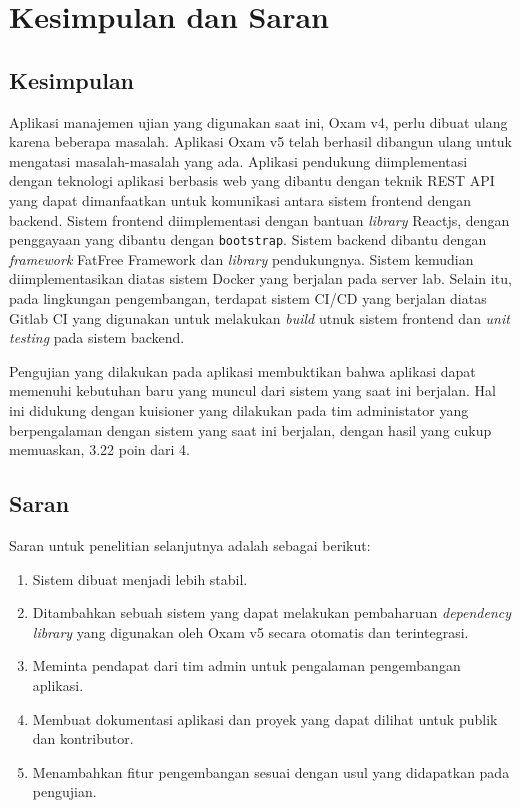 \chapter{Kesimpulan dan Saran}
\label{chap:kesimpulan-saran}

\section{Kesimpulan}
    Aplikasi manajemen ujian yang digunakan saat ini, Oxam v4, perlu dibuat ulang karena beberapa masalah. 
    Aplikasi Oxam v5 telah berhasil dibangun ulang untuk mengatasi masalah-masalah yang ada.
    Aplikasi pendukung diimplementasi dengan teknologi aplikasi berbasis web yang dibantu dengan teknik REST API
    yang dapat dimanfaatkan untuk komunikasi antara sistem frontend dengan backend. Sistem frontend diimplementasi
    dengan bantuan \textit{library} Reactjs, dengan penggayaan yang dibantu dengan \texttt{bootstrap}. Sistem
    backend dibantu dengan \textit{framework} FatFree Framework dan \textit{library} pendukungnya. Sistem
    kemudian diimplementasikan diatas sistem Docker yang berjalan pada server lab. Selain itu, pada lingkungan
    pengembangan, terdapat sistem CI/CD yang berjalan diatas Gitlab CI yang digunakan untuk melakukan
    \textit{build} utnuk sistem frontend dan \textit{unit testing} pada sistem backend.
    
    Pengujian yang dilakukan pada aplikasi membuktikan  bahwa aplikasi dapat memenuhi kebutuhan baru yang muncul
    dari sistem yang saat ini berjalan. Hal ini didukung dengan kuisioner yang dilakukan pada tim administator
    yang berpengalaman dengan sistem yang saat ini berjalan, dengan hasil yang cukup memuaskan, 3.22 poin dari 4.
    
\section{Saran}
    Saran untuk penelitian selanjutnya adalah sebagai berikut:
    \begin{enumerate}
        \item Sistem dibuat menjadi lebih stabil.
        \item Ditambahkan sebuah sistem yang dapat melakukan pembaharuan \textit{dependency library} yang
            digunakan oleh Oxam v5 secara otomatis dan terintegrasi.
        \item Meminta pendapat dari tim admin untuk pengalaman pengembangan aplikasi.
        \item Membuat dokumentasi aplikasi dan proyek yang dapat dilihat untuk publik dan kontributor.
        \item Menambahkan fitur pengembangan sesuai dengan usul yang didapatkan pada pengujian.
    \end{enumerate}